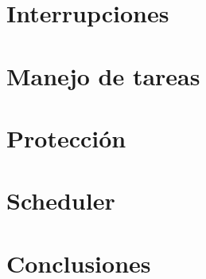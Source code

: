 \documentclass[10pt, a4paper]{article}
\begin{document}
	\section{Interrupciones}
		
	\clearpage

	\section{Manejo de tareas}
		
	\clearpage


	\section{Protección}
		
	\clearpage

	\section{Scheduler}
		
	\clearpage

	\section{Conclusiones}
		
\end{document}
